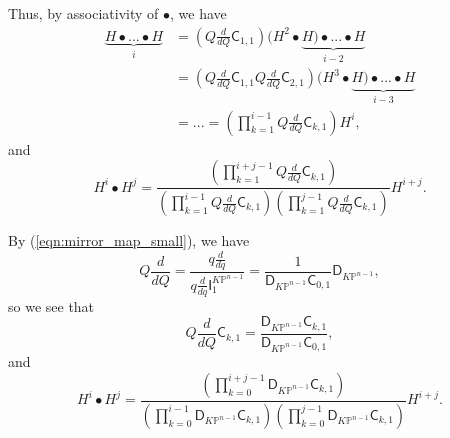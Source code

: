 \documentclass[12pt]{amsart}
\numberwithin{equation}{section}
\newcommand{\KP}{K\mathbb{P}}
\begin{document}
Thus, by associativity of $\bullet$, we have
\begin{equation*}
\begin{split}
\underbrace{H\bullet...\bullet H}_{i}&=\left(Q\frac{d}{dQ}\mathsf{C}_{1,1}\right)(H^2\bullet \underbrace{H)\bullet...\bullet H}_{i-2}\\
&=\left(Q\frac{d}{dQ}\mathsf{C}_{1,1}Q\frac{d}{dQ}\mathsf{C}_{2,1}\right)(H^3\bullet \underbrace{H)\bullet...\bullet H}_{i-3}\\
&=...=\left(\prod_{k=1}^{i-1}Q\frac{d}{dQ}\mathsf{C}_{k,1}\right)H^i,
\end{split}
\end{equation*}
and
\begin{equation*}
H^i\bullet H^j=\frac{\left(\prod_{k=1}^{i+j-1}Q\frac{d}{dQ}\mathsf{C}_{k,1}\right)}{\left(\prod_{k=1}^{i-1}Q\frac{d}{dQ}\mathsf{C}_{k,1}\right)\left(\prod_{k=1}^{j-1}Q\frac{d}{dQ}\mathsf{C}_{k,1}\right)} H^{i+j}.  \end{equation*}

By (\ref{eqn:mirror_map_small}), we have 
\begin{equation}\label{eqn:QddQ_to_qddq}
Q\frac{d}{dQ}=\frac{q\frac{d}{dq}}{q\frac{d}{dq}\mathsf{I}_1^{\KP^{n-1}}}=\frac{1}{\mathsf{D}_{K\mathbb{P}^{n-1}}\mathsf{C}_{0,1}}\mathsf{D}_{K\mathbb{P}^{n-1}},
\end{equation}
so we see that
\begin{equation*}
Q\frac{d}{dQ}\mathsf{C}_{k,1}=\frac{\mathsf{D}_{K\mathbb{P}^{n-1}}\mathsf{C}_{k,1}}{\mathsf{D}_{K\mathbb{P}^{n-1}}\mathsf{C}_{0,1}}, \end{equation*}
and
\begin{equation*}
H^i\bullet H^j=\frac{\left(\prod_{k=0}^{i+j-1}\mathsf{D}_{K\mathbb{P}^{n-1}}\mathsf{C}_{k,1}\right)}{\left(\prod_{k=0}^{i-1}\mathsf{D}_{K\mathbb{P}^{n-1}}\mathsf{C}_{k,1}\right)\left(\prod_{k=0}^{j-1}\mathsf{D}_{K\mathbb{P}^{n-1}}\mathsf{C}_{k,1}\right)} H^{i+j}. \end{equation*}
\end{document}
